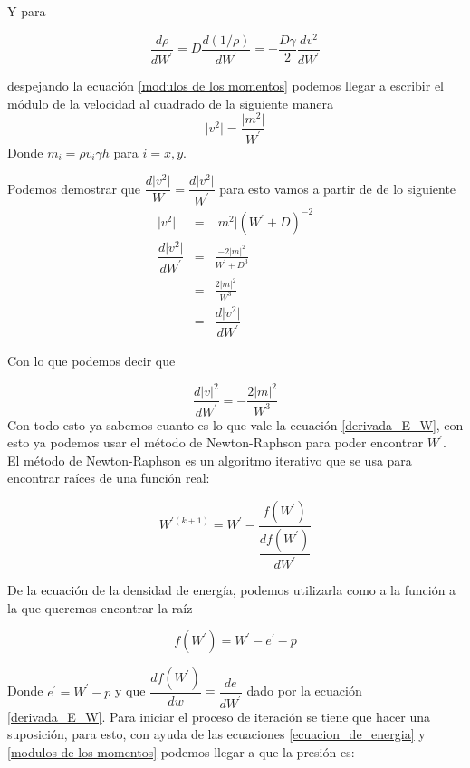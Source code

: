 \documentclass[12pt,a4paper]{book}
\providecommand{\abs}[1]{\lvert#1\rvert} %
\begin{document}
Y para

\begin{equation}\label{der_rho}
\dfrac{d \rho}{d W^{'}}= D \dfrac{d\left(1/ \rho \right) }{d W^{'}} = - \frac{D \gamma}{2}  \dfrac{d v^2}{dW^{'}}
\end{equation}

despejando la ecuación \ref{modulos de los momentos} podemos llegar a escribir el módulo de la velocidad al cuadrado de la siguiente manera
\begin{equation}
\abs{v^{2}} = \frac{\abs{m^{2}}}{W^{'}} 
\end{equation}
Donde $m_i= \rho v_i \gamma h$ para $i=x,y$.

Podemos demostrar que $\dfrac{d \abs{v^2}}{W}=\dfrac{d \abs{v^2}}{W^{'}}$ para esto vamos a partir de de lo siguiente 
\begin{eqnarray*}
\abs{v^2}&=& \abs{m^{2}} \left(W^{'} + D \right)^{-2} \\
\dfrac{d \abs{v^2}}{d W^{'}} &=& \frac{-2 \abs{m}^2}{W^{'}+D^{3}} \\
&=& \frac{2 \abs{m}^2}{W^{3}} \\
&=& \dfrac{d \abs{v^2}}{d W^{'}}
\end{eqnarray*}

Con lo que podemos decir que 

\begin{equation}\label{der_v2}
\dfrac{d\abs{v}^2}{d W^{'} }=-\frac{2 \abs{m}^{2}}{W^{3}}
\end{equation}
Con todo esto ya sabemos cuanto es lo que vale la ecuación \ref{derivada_E_W}, con esto ya podemos usar el método de Newton-Raphson para poder encontrar $W^{'}$.\\

El método de Newton-Raphson es un algoritmo iterativo que se usa para encontrar raíces  de una función real:

\begin{equation} \label{eq_Newton_Raphson}
W^{'(k+1)}=W^{'}-\frac{f(W^{'})}{\dfrac{d f(W^{'})}{d W^{'}}}
\end{equation}

De la ecuación de la densidad de energía, podemos utilizarla como a la función a la que queremos encontrar la raíz

\begin{equation} \label{ecuación_f}
f(W^{'})=W^{'}-e^{'}-p
\end{equation}

Donde $e^{'}=W^{'}-p$ y que $\dfrac{d f(W^{'})}{d w} \equiv \dfrac{de}{dW^{'}}$ dado por la ecuación \ref{derivada_E_W}. 
Para iniciar el proceso de iteración se tiene que hacer una suposición, para esto, con ayuda de las ecuaciones \ref{ecuacion_de_energia} 
y \ref{modulos de los momentos} podemos llegar a que la presión es:
\end{document}
